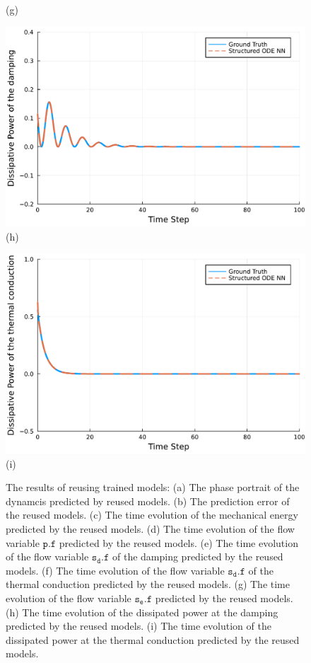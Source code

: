 \documentclass[
	parskip, 			   %
	twoside, 			   %
	DIV=14, 			   %
	BCOR=15.0mm, 		   %
	headsepline, 		   %
	open=right, 		   %
	captions=tableheading, %
	bibliography=totoc,    %
	numbers=noenddot       %
]{scrreprt}
\begin{document}
\begin{figure}[h!]
\begin{minipage}{.3\textwidth}
    \\(g)
    \end{minipage}%
    \begin{minipage}{.3\textwidth}
    \centering
    \includegraphics[width=1\linewidth]{figures/dissipative_power_damping_ndho_with_EPHS_structure_reuse.pdf}
    \\(h)
    \end{minipage}%
    \begin{minipage}{.3\textwidth}
    \centering
    \includegraphics[width=1\linewidth]{figures/dissipative_power_thermal_conduction_ndho_with_EPHS_structure_reuse.pdf}
    \\(i)
    \end{minipage}
    \caption{The results of reusing trained models: (a) The phase portrait of the dynamcis predicted by reused models. (b) The prediction error of the reused models. (c) The time evolution of the mechanical energy predicted by the reused models. (d) The time evolution of the flow variable $\mathtt{p.f}$ predicted by the reused models. (e) The time evolution of the flow variable $\mathtt{s_{d}.f}$ of the damping predicted by the reused models. (f) The time evolution of the flow variable $\mathtt{s_{d}.f}$ of the thermal conduction predicted by the reused models. (g) The time evolution of the flow variable $\mathtt{s_e.f}$ predicted by the reused models. (h) The time evolution of the dissipated power at the damping predicted by the reused models. (i) The time evolution of the dissipated power at the thermal conduction predicted by the reused models.}

\end{figure}
\end{document}
